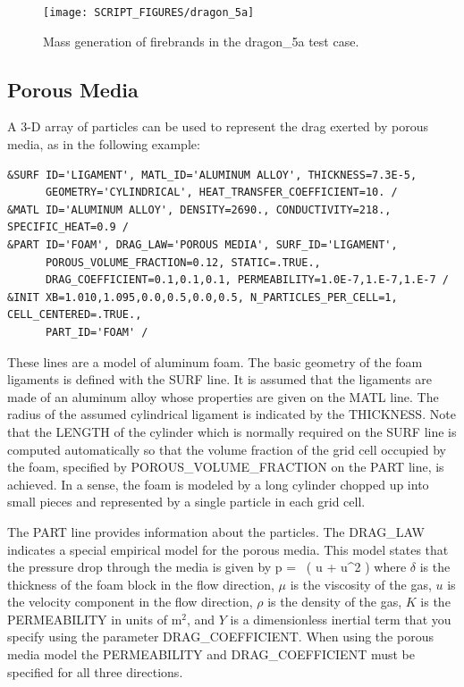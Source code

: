 \documentclass[11pt]{book}
\begin{document}
\begin{figure}[ht]
\begin{center}
\texttt{[image: SCRIPT\_FIGURES/dragon\_5a]}
\end{center}
\caption[Mass generation of firebrands in the {\ct dragon\_5a} test case]{Mass generation of firebrands in the {\ct dragon\_5a} test case.}
\label{dragon_5a_fig}
\end{figure}

\subsection{Porous Media}
\label{info:porous_media}

A 3-D array of particles can be used to represent the drag exerted by porous media, as in the following example:
\begin{lstlisting}
&SURF ID='LIGAMENT', MATL_ID='ALUMINUM ALLOY', THICKNESS=7.3E-5,
      GEOMETRY='CYLINDRICAL', HEAT_TRANSFER_COEFFICIENT=10. /
&MATL ID='ALUMINUM ALLOY', DENSITY=2690., CONDUCTIVITY=218., SPECIFIC_HEAT=0.9 /
&PART ID='FOAM', DRAG_LAW='POROUS MEDIA', SURF_ID='LIGAMENT',
      POROUS_VOLUME_FRACTION=0.12, STATIC=.TRUE.,
      DRAG_COEFFICIENT=0.1,0.1,0.1, PERMEABILITY=1.0E-7,1.E-7,1.E-7 /
&INIT XB=1.010,1.095,0.0,0.5,0.0,0.5, N_PARTICLES_PER_CELL=1, CELL_CENTERED=.TRUE.,
      PART_ID='FOAM' /
\end{lstlisting}
These lines are a model of aluminum foam. The basic geometry of the foam ligaments is defined with the {\ct SURF} line. It is assumed that the ligaments are made of an aluminum alloy whose properties are given on the {\ct MATL} line. The radius of the assumed cylindrical ligament is indicated by the {\ct THICKNESS}. Note that the {\ct LENGTH} of the cylinder which is normally required on the {\ct SURF} line is computed automatically so that the volume fraction of the grid cell occupied by the foam, specified by {\ct POROUS\_VOLUME\_FRACTION} on the {\ct PART} line, is achieved. In a sense, the foam is modeled by a long cylinder chopped up into small pieces and represented by a single particle in each grid cell.

The {\ct PART} line provides information about the particles. The {\ct DRAG\_LAW} indicates a special empirical model for the porous media. This model states that the pressure drop through the media is given by
\be
   \label{eqn_porous_media}
   \Delta p =  \delta \, \left( u + \rho {} u^2 \right)
\ee
where $\delta$ is the thickness of the foam block in the flow direction, $\mu$ is the viscosity of the gas, $u$ is the velocity component in the flow direction, $\rho$ is the density of the gas, $K$ is the {\ct PERMEABILITY} in units of m$^2$, and $Y$ is a dimensionless inertial term that you specify using the parameter {\ct DRAG\_COEFFICIENT}.  When using the porous media model the {\ct PERMEABILITY} and {\ct DRAG\_COEFFICIENT} must be specified for all three directions.
\end{document}
